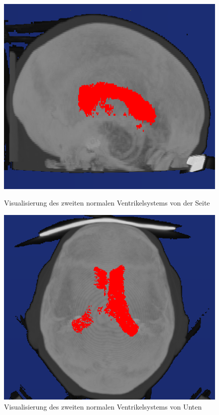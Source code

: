 \begin{figure}[H]
\begin{minipage}[b]{.5\textwidth}
  \centering
  \includegraphics[width=.98\linewidth, height=.98\linewidth]{Logos/Normal2/Seite2.PNG}
  \caption{Visualisierung des zweiten normalen Ventrikelsystems von der Seite}
  \label{fig:norm2_s}
\end{minipage}%
\begin{minipage}[b]{.5\textwidth}
  \centering
  \includegraphics[width=.98\linewidth, height=.98\linewidth]{Logos/Normal2/Unten3.PNG}
  \caption{Visualisierung des zweiten normalen Ventrikelsystems von Unten}
  \label{fig:norm2_u}
\end{minipage}
\end{figure}

